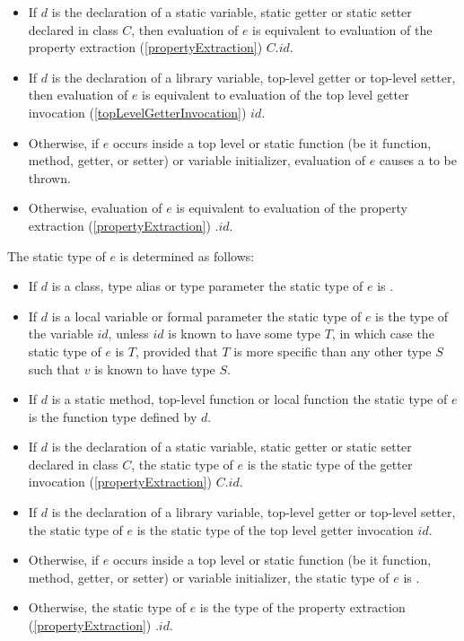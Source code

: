 \documentclass{article}
\begin{document}
\begin{itemize}
\item If $d$ is the declaration of a static variable, static getter or static setter declared in class $C$, then evaluation of $e$ is equivalent to evaluation of the property extraction (\ref{propertyExtraction}) $C.id$.
\item If $d$ is the declaration of a library variable, top-level getter or top-level setter, then evaluation of $e$ is equivalent to evaluation of the top level getter invocation (\ref{topLevelGetterInvocation}) $id$.
\item Otherwise, if $e$ occurs inside a top level or static function (be it function, method, getter, or setter) or variable initializer, evaluation of $e$ causes a  to be thrown.
\item Otherwise, evaluation of $e$ is equivalent to evaluation of the property extraction (\ref{propertyExtraction}) \THIS{}.$id$.
\end{itemize}

\LMHash{}
The static type of $e$ is determined as follows:

\begin{itemize}
\item If $d$ is a class, type alias or type parameter the static type of $e$ is .
\item If $d$ is a local variable or formal parameter the static type of $e$ is the type of the variable $id$, unless $id$ is known to have some type $T$, in which case the static type of $e$ is $T$, provided that $T$ is more specific than any other type $S$ such that $v$ is known to have type $S$.
\item If $d$ is a static method, top-level function or local function the static type of $e$ is the function type defined by $d$.
\item If $d$ is the declaration of a static variable, static getter or static setter declared in class $C$, the static type of $e$ is the static type of the getter invocation (\ref{propertyExtraction}) $C.id$.
\item If $d$ is the declaration of a library variable, top-level getter or top-level setter, the static type of $e$ is the static type of the top level getter invocation $id$.
\item Otherwise, if $e$ occurs inside a top level or static function (be it function, method, getter, or setter) or variable initializer, the static type of $e$ is \DYNAMIC{}.
\item Otherwise, the static type of $e$ is the type of the property extraction (\ref{propertyExtraction}) \THIS{}.$id$.
\end{itemize}
\end{document}
